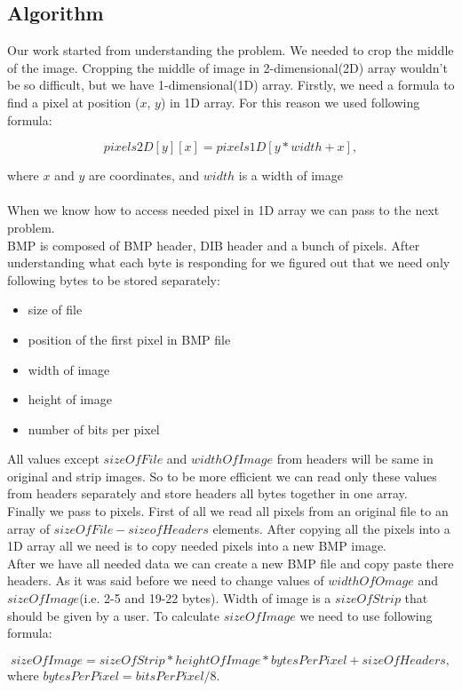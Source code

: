 \documentclass[a4paper]{article}
\begin{document}
\subsection{Algorithm}

Our work started from understanding the problem. We needed to crop the middle of the image. Cropping the middle of image in 2-dimensional(2D) array wouldn't be so difficult, but we have 1-dimensional(1D) array. Firstly, we need a formula to find a pixel at position ($x$, $y$) in 1D array. For this reason we used following formula:

\[pixels2D[y][x] = pixels1D[y * width + x],\]

where $x$ and $y$ are coordinates, and $width$ is a width of image\\\\
When we know how to access needed pixel in 1D array we can pass to the next problem. \\
BMP is composed of BMP header, DIB header and a bunch of pixels. After understanding what each byte is responding for we figured out that we need only following bytes to be stored separately:
\begin{itemize}
\item size of file
\item position of the first pixel in BMP file
\item width of image
\item height of image
\item number of bits per pixel
\end{itemize}
All values except $size Of File$ and $width Of Image$ from headers will be same in original and strip images. So to be more efficient we can read only these values from headers separately and store headers all bytes together in one array.\\
Finally we pass to pixels. First of all we read all pixels from an original file to an array of $size Of File - size of Headers$ elements. After copying all the pixels into a 1D array all we need is to copy needed pixels into a new BMP image.\\
After we have all needed data we can create a new BMP file and copy paste there headers. As it was said before we need to change values of $width Of Omage$ and $size Of Image$(i.e. 2-5 and 19-22 bytes). Width of image is a $size Of Strip$ that should be given by a user. To calculate $size Of Image$ we need to use following formula:

\[size Of Image = size Of Strip * height Of Image * bytes Per Pixel + size Of Headers,\]
where $bytes Per Pixel = bits Per Pixel / 8$.\\
\end{document}
